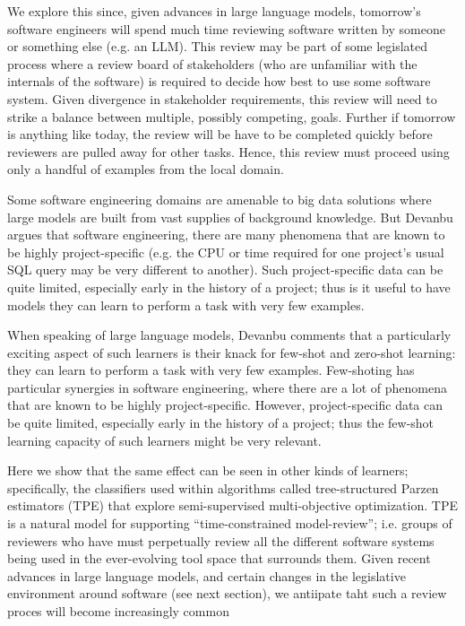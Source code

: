 We explore this since, given advances in large language models, 
tomorrow's software engineers will spend much time reviewing  software written by someone or something else (e.g. an LLM).  This review may be part of some legislated  process where a review board of stakeholders (who are unfamiliar with the internals of the software) is  required to decide how best to use some software system.
Given   divergence in stakeholder requirements, this review   will need  to strike a balance between multiple, possibly competing, goals.
Further if tomorrow is anything like today, the  review    will be have to be completed quickly before     reviewers are pulled 
away for  other tasks. Hence, this review must proceed using only a handful of examples from the local domain.



Some software engineering domains are amenable to big data solutions
where large models are built from vast supplies of background knowledge.
But Devanbu argues that  software engineering,  there are many phenomena that are known to be highly project-specific (e.g. the CPU or time required for one project's usual SQL query may be very different to another).  Such project-specific
data can be quite limited, especially early in the history of a project; thus is it useful to have models 
they can learn to perform a task with very few examples.


When speaking of large language models, Devanbu comments that
a particularly exciting aspect of such learners is their knack for few-shot and zero-shot learning: they can learn to perform a task with very few examples. Few-shoting has particular synergies in software engineering, where there are a lot of phenomena  that are known to be highly project-specific. However, project-specific data can be quite limited, especially early in the history of a project; thus the few-shot learning capacity of such learners might be very relevant.

Here we show that the same effect can be seen in other kinds of learners; specifically, the classifiers used within algorithms called
tree-structured Parzen estimators (TPE) that explore semi-supervised
multi-objective optimization.   TPE is a natural  model for supporting
``time-constrained model-review''; i.e. groups of reviewers who have
 must perpetually review all the different  software systems
 being used in the ever-evolving tool space that surrounds them.
Given recent advances in large language models, and certain changes in the legislative environment around software (see next section),  we antiipate taht such a review proces will become increasingly common 



